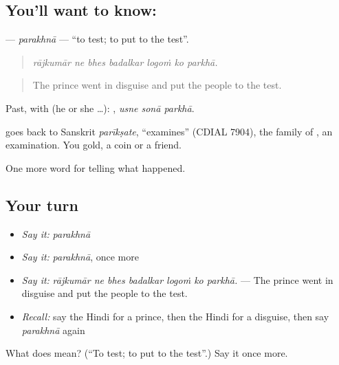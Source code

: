 \subsection*{You'll want to know: }
\textbf{} — \emph{parakhnā} — \textquotedblleft{}to test; to put to the test\textquotedblright{}.

\begin{quote}
      
\end{quote}

\begin{quote}
\emph{rājkumār ne bhes badalkar logoṁ ko parkhā.}
\end{quote}

\begin{quote}
The prince went in disguise and put the people to the test.
\end{quote}

Past, with  (he or she …):   , \emph{usne sonā parkhā}.

\begin{cousinweb}
goes back to Sanskrit \emph{parīkṣate}, \textquotedblleft{}examines\textquotedblright{} (CDIAL 7904), the family of \textbf{}, an examination. You \textbf{} gold, a coin or a friend.
\end{cousinweb}

\begin{grammarlens}[title={What you've built}]
One more word for telling what happened.
\end{grammarlens}

\subsection*{Your turn}
\begin{itemize}
\raggedright
  \item \emph{Say it:} \emph{parakhnā}
  \item \emph{Say it:} \emph{parakhnā}, once more
  \item \emph{Say it:} \emph{rājkumār ne bhes badalkar logoṁ ko parkhā.} — The prince went in disguise and put the people to the test.
  \item \emph{Recall:} say the Hindi for a prince, then the Hindi for a disguise, then say \emph{parakhnā} again
\end{itemize}

\begin{tcolorbox}[breakable,colback=teal!4,colframe=teal!35!black,title={Before you move on}]
What does  mean? (\textquotedblleft{}To test; to put to the test\textquotedblright{}.) Say it once more.
\end{tcolorbox}
